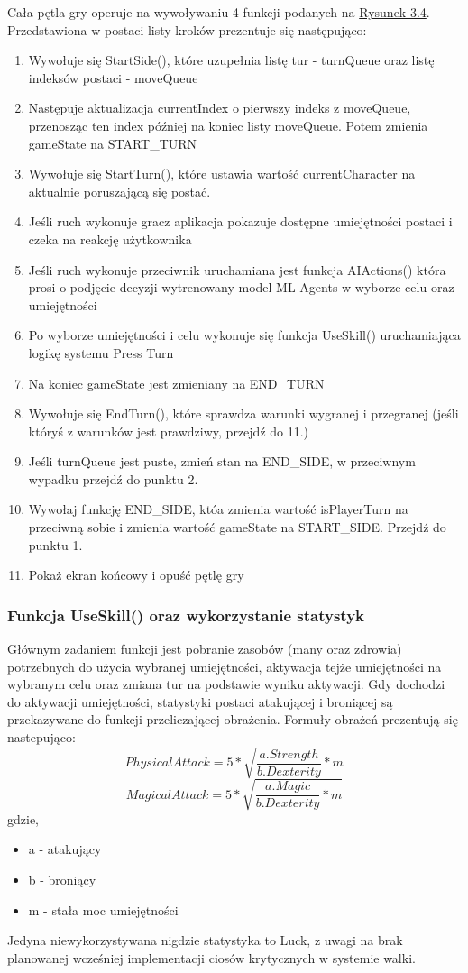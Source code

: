 \documentclass{SGGW-thesis}
\begin{document}
Cała pętla gry operuje na wywoływaniu 4 funkcji podanych na \hyperref[fig:UpdateBattle]{Rysunek 3.4}. Przedstawiona w postaci listy kroków prezentuje się następująco:
\begin{enumerate}
  \item{Wywołuje się StartSide(), które uzupełnia listę tur - turnQueue oraz listę indeksów postaci - moveQueue}
  \item{Następuje aktualizacja currentIndex o pierwszy indeks z moveQueue, przenosząc ten index później na koniec listy moveQueue. Potem zmienia gameState na START\_TURN}
  \item{Wywołuje się StartTurn(), które ustawia wartość currentCharacter na aktualnie poruszającą się postać.}
  \item{Jeśli ruch wykonuje gracz aplikacja pokazuje dostępne umiejętności postaci i czeka na reakcję użytkownika}
  \item{Jeśli ruch wykonuje przeciwnik uruchamiana jest funkcja AIActions() która prosi o podjęcie decyzji wytrenowany model ML-Agents w wyborze celu oraz umiejętności}
  \item{Po wyborze umiejętności i celu wykonuje się funkcja UseSkill() uruchamiająca logikę systemu Press Turn}
  \item{Na koniec gameState jest zmieniany na END\_TURN}
  \item{Wywołuje się EndTurn(), które sprawdza warunki wygranej i przegranej (jeśli któryś z warunków jest prawdziwy, przejdź do 11.)}
  \item{Jeśli turnQueue jest puste, zmień stan na END\_SIDE, w przeciwnym wypadku przejdź do punktu 2.}
  \item{Wywołaj funkcję END\_SIDE, któa zmienia wartość isPlayerTurn na przeciwną sobie i zmienia wartość gameState na START\_SIDE. Przejdź do punktu 1.}
  \item{Pokaż ekran końcowy i opuść pętlę gry}
\end{enumerate}

\subsubsection{Funkcja UseSkill() oraz wykorzystanie statystyk}
Głównym zadaniem funkcji jest pobranie zasobów (many oraz zdrowia) potrzebnych do użycia wybranej umiejętności, aktywacja tejże umiejętności na wybranym celu oraz zmiana tur na podstawie wyniku aktywacji.
Gdy dochodzi do aktywacji umiejętności, statystyki postaci atakującej i broniącej są przekazywane do funkcji przeliczającej obrażenia. Formuły obrażeń prezentują się nastepująco:
\[PhysicalAttack = 5*\sqrt{\frac{a.Strength}{b.Dexterity}*m}\]\[MagicalAttack = 5*\sqrt{\frac{a.Magic}{b.Dexterity}*m}\]
gdzie,
\begin{itemize}
  \item{a - atakujący}
  \item{b - broniący}
  \item{m - stała moc umiejętności}
\end{itemize}
Jedyna niewykorzystywana nigdzie statystyka to Luck, z uwagi na brak planowanej wcześniej implementacji ciosów krytycznych w systemie walki.
\end{document}
